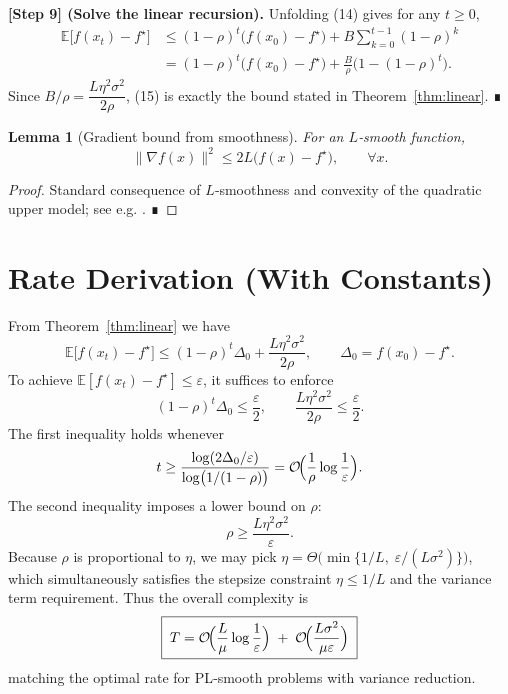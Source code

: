 \documentclass{article}
\newtheorem{lemma}{Lemma}
\newcommand{\E}{\mathbb{E}}
\begin{document}
\noindent\textbf{[Step 9] (Solve the linear recursion).}
Unfolding (14) gives for any $t\ge0$,
\begin{align}
\E\bigl[f(x_{t})-f^{\star}\bigr]
 &\le (1-\rho)^{t}\bigl(f(x_{0})-f^{\star}\bigr)
    +B\sum_{k=0}^{t-1}(1-\rho)^{k} \nonumber\\
 & = (1-\rho)^{t}\bigl(f(x_{0})-f^{\star}\bigr)
    +\frac{B}{\rho}\bigl(1-(1-\rho)^{t}\bigr). \tag{15}
\end{align}
Since $B/\rho= \dfrac{L\eta^{2}\sigma^{2}}{2\rho}$, (15) is exactly the bound
stated in Theorem~\ref{thm:linear}. ∎

\begin{lemma}[Gradient bound from smoothness]\label{lem:gradbound}
For an $L$‑smooth function,
\[
\|\nabla f(x)\|^{2}\le 2L\bigl(f(x)-f^{\star}\bigr),\qquad\forall x.
\]
\end{lemma}
\begin{proof}
Standard consequence of $L$‑smoothness and convexity of the quadratic
upper model; see e.g. \cite{nesterov2004introductory}. ∎
\end{proof}

\section*{Rate Derivation (With Constants)}
From Theorem~\ref{thm:linear} we have
\[
\E\bigl[f(x_{t})-f^{\star}\bigr]\le
(1-\rho)^{t}\Delta_{0}+\frac{L\eta^{2}\sigma^{2}}{2\rho},
\qquad
\Delta_{0}=f(x_{0})-f^{\star}.
\]
To achieve $\E[f(x_{t})-f^{\star}]\le\varepsilon$, it suffices to enforce
\[
(1-\rho)^{t}\Delta_{0}\le\frac{\varepsilon}{2},
\qquad
\frac{L\eta^{2}\sigma^{2}}{2\rho}\le\frac{\varepsilon}{2}.
\]
The first inequality holds whenever
\[
t\ge\frac{\log(2\Delta_{0}/\varepsilon)}{\log\bigl(1/(1-\rho)\bigr)}
   =\mathcal O\!\Bigl(\frac{1}{\rho}\log\frac{1}{\varepsilon}\Bigr).
\]
The second inequality imposes a lower bound on $\rho$:
\[
\rho\ge\frac{L\eta^{2}\sigma^{2}}{\varepsilon}.
\]
Because $\rho$ is proportional to $\eta$, we may pick
$\eta=\Theta\bigl(\min\{1/L,\;\varepsilon/(L\sigma^{2})\}\bigr)$,
which simultaneously satisfies the stepsize constraint
$\eta\le1/L$ and the variance term requirement.
Thus the overall complexity is
\[
\boxed{\;T = \mathcal O\!\Bigl(\frac{L}{\mu}\log\frac{1}{\varepsilon}\Bigr)
       \;+\; \mathcal O\!\Bigl(\frac{L\sigma^{2}}{\mu\varepsilon}\Bigr)\;}
\]
matching the optimal rate for PL‑smooth problems with variance reduction.
\end{document}
